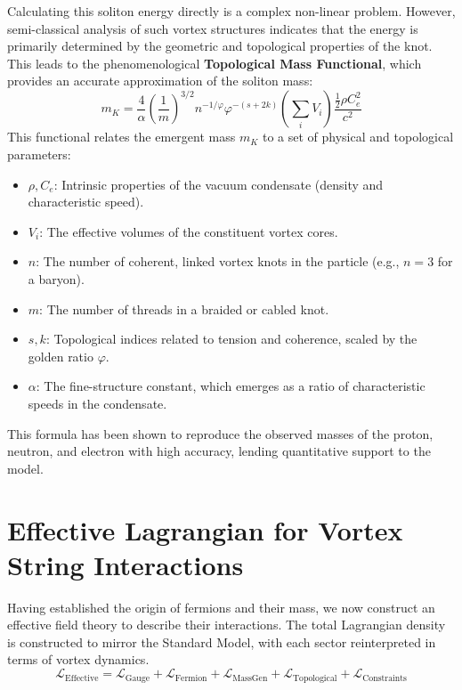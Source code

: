 \documentclass[a4paper,12pt]{article}
\begin{document}
    Calculating this soliton energy directly is a complex non-linear problem. However, semi-classical analysis of such vortex structures \cite{Faddeev1997} indicates that the energy is primarily determined by the geometric and topological properties of the knot. This leads to the phenomenological \textbf{Topological Mass Functional}, which provides an accurate approximation of the soliton mass:
    \begin{equation}
        m_K = \frac{4}{\alpha} \left(\frac{1}{m}\right)^{3/2} n^{-1/\varphi} \varphi^{-(s+2k)} \left(\sum_i V_i\right) \frac{\frac{1}{2}\rho C_e^2}{c^2}
        \label{eq:mass_formula}
    \end{equation}
    This functional relates the emergent mass $m_K$ to a set of physical and topological parameters:
    \begin{itemize}
        \item $\rho, C_e$: Intrinsic properties of the vacuum condensate (density and characteristic speed).
        \item $V_i$: The effective volumes of the constituent vortex cores.
        \item $n$: The number of coherent, linked vortex knots in the particle (e.g., $n=3$ for a baryon).
        \item $m$: The number of threads in a braided or cabled knot.
        \item $s, k$: Topological indices related to tension and coherence, scaled by the golden ratio $\varphi$.
        \item $\alpha$: The fine-structure constant, which emerges as a ratio of characteristic speeds in the condensate.
    \end{itemize}
    This formula has been shown to reproduce the observed masses of the proton, neutron, and electron with high accuracy, lending quantitative support to the model.

    \section{Effective Lagrangian for Vortex String Interactions}

    Having established the origin of fermions and their mass, we now construct an effective field theory to describe their interactions. The total Lagrangian density is constructed to mirror the Standard Model, with each sector reinterpreted in terms of vortex dynamics.
    \begin{equation}
        \mathcal{L}_{\text{Effective}} = \mathcal{L}_{\text{Gauge}} + \mathcal{L}_{\text{Fermion}} + \mathcal{L}_{\text{MassGen}} + \mathcal{L}_{\text{Topological}} + \mathcal{L}_{\text{Constraints}}
    \end{equation}
\end{document}
